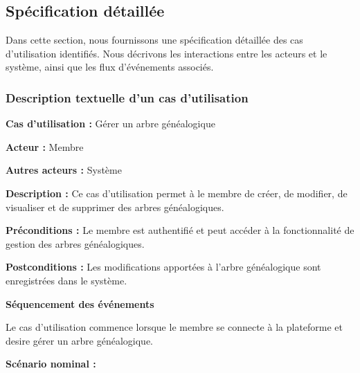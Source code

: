 \newpage

\subsection{Spécification détaillée }
Dans cette section, nous fournissons une spécification détaillée des cas
d’utilisation identifiés. Nous décrivons les interactions entre les acteurs et
le système, ainsi que les flux d’événements associés.

\subsubsection{Description textuelle d'un cas d'utilisation}
\textbf{Cas d’utilisation :} Gérer un arbre généalogique

\textbf{Acteur :} Membre

\textbf{Autres acteurs :} Système

\textbf{Description :} Ce cas d’utilisation permet à le membre de créer,
de modifier, de visualiser et de supprimer des arbres généalogiques.

\textbf{Préconditions :} Le membre est authentifié et peut accéder à la
fonctionnalité de gestion des arbres généalogiques.

\textbf{Postconditions :} Les modifications apportées à l'arbre généalogique
sont enregistrées dans le système.

\textbf{Séquencement des événements}

Le cas d’utilisation commence lorsque le membre se connecte à la plateforme
et desire gérer un arbre généalogique.

\textbf{Scénario nominal :}

